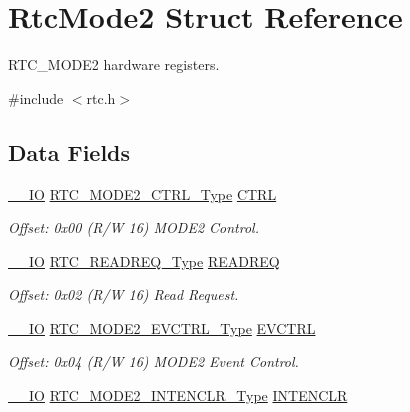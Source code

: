 \hypertarget{struct_rtc_mode2}{}\section{Rtc\+Mode2 Struct Reference}
\label{struct_rtc_mode2}


R\+T\+C\+\_\+\+M\+O\+D\+E2 hardware registers.  




{\ttfamily \#include $<$rtc.\+h$>$}

\subsection*{Data Fields}
\begin{DoxyCompactItemize}
\item 
\mbox{\hyperlink{core__cm0plus_8h_aec43007d9998a0a0e01faede4133d6be}{\+\_\+\+\_\+\+IO}} \mbox{\hyperlink{union_r_t_c___m_o_d_e2___c_t_r_l___type}{R\+T\+C\+\_\+\+M\+O\+D\+E2\+\_\+\+C\+T\+R\+L\+\_\+\+Type}} \mbox{\hyperlink{struct_rtc_mode2_a0830f08acb06fd9e539fd6b7ebd46882}{C\+T\+RL}}
\begin{DoxyCompactList}\small\item\em Offset\+: 0x00 (R/W 16) M\+O\+D\+E2 Control. \end{DoxyCompactList}\item 
\mbox{\hyperlink{core__cm0plus_8h_aec43007d9998a0a0e01faede4133d6be}{\+\_\+\+\_\+\+IO}} \mbox{\hyperlink{union_r_t_c___r_e_a_d_r_e_q___type}{R\+T\+C\+\_\+\+R\+E\+A\+D\+R\+E\+Q\+\_\+\+Type}} \mbox{\hyperlink{struct_rtc_mode2_aa1779f0fc09662a56db255c1637c56c0}{R\+E\+A\+D\+R\+EQ}}
\begin{DoxyCompactList}\small\item\em Offset\+: 0x02 (R/W 16) Read Request. \end{DoxyCompactList}\item 
\mbox{\hyperlink{core__cm0plus_8h_aec43007d9998a0a0e01faede4133d6be}{\+\_\+\+\_\+\+IO}} \mbox{\hyperlink{union_r_t_c___m_o_d_e2___e_v_c_t_r_l___type}{R\+T\+C\+\_\+\+M\+O\+D\+E2\+\_\+\+E\+V\+C\+T\+R\+L\+\_\+\+Type}} \mbox{\hyperlink{struct_rtc_mode2_ae0b80d4b65e5f2a92963db08f9657cd6}{E\+V\+C\+T\+RL}}
\begin{DoxyCompactList}\small\item\em Offset\+: 0x04 (R/W 16) M\+O\+D\+E2 Event Control. \end{DoxyCompactList}\item 
\mbox{\hyperlink{core__cm0plus_8h_aec43007d9998a0a0e01faede4133d6be}{\+\_\+\+\_\+\+IO}} \mbox{\hyperlink{union_r_t_c___m_o_d_e2___i_n_t_e_n_c_l_r___type}{R\+T\+C\+\_\+\+M\+O\+D\+E2\+\_\+\+I\+N\+T\+E\+N\+C\+L\+R\+\_\+\+Type}} \mbox{\hyperlink{struct_rtc_mode2_a8439b201b6495b35f3619e901cf35a63}{I\+N\+T\+E\+N\+C\+LR}}

\end{DoxyCompactItemize}
